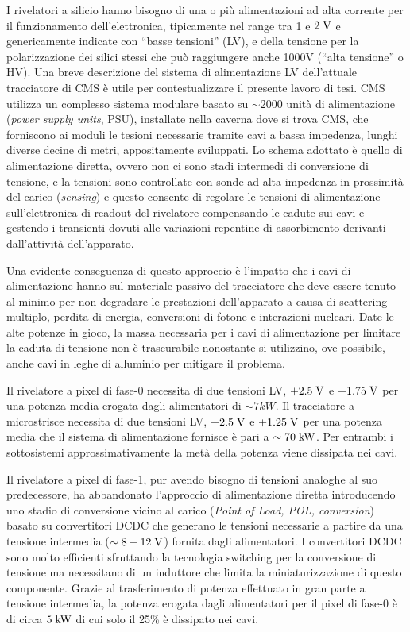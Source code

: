 I rivelatori a silicio hanno bisogno di una o pi\`u alimentazioni ad alta corrente per il funzionamento dell'elettronica, tipicamente nel range tra 1 e $2\rm \; V$ e genericamente indicate con ``basse tensioni'' (LV), e della tensione per la polarizzazione dei silici stessi che pu\`o raggiungere anche 1000V (``alta tensione'' o HV). Una breve descrizione del sistema di alimentazione LV dell'attuale tracciatore di CMS \`e utile per contestualizzare il presente lavoro di tesi. CMS utilizza un complesso sistema modulare basato su $\sim 2000$ unit\`a di alimentazione ({\em power supply units}, PSU), installate nella caverna dove si trova CMS, che forniscono ai moduli le tesioni necessarie tramite cavi a bassa impedenza, lunghi diverse decine di metri,
appositamente sviluppati. Lo schema adottato \`e quello di alimentazione diretta, ovvero non ci sono stadi intermedi di conversione di tensione, e la tensioni sono controllate con sonde ad alta impedenza in prossimit\`a del carico ({\em sensing}) e questo consente di regolare le tensioni di alimentazione sull’elettronica di readout del rivelatore compensando le cadute sui cavi e gestendo i transienti dovuti alle variazioni repentine di assorbimento derivanti dall'attivit\`a dell'apparato.

Una evidente conseguenza di questo approccio \`e l'impatto che i cavi di alimentazione hanno sul materiale passivo del tracciatore che deve essere tenuto al minimo per non degradare le prestazioni dell'apparato a causa di scattering multiplo, perdita di energia, conversioni di fotone e interazioni nucleari.  
Date le alte potenze in gioco, la massa necessaria per i cavi di alimentazione per limitare la caduta di tensione non \`e trascurabile nonostante si utilizzino, ove possibile, anche cavi in leghe di alluminio per mitigare il problema.

Il rivelatore a pixel di fase-0 necessita di due tensioni LV, $+2.5\rm \; V$ e $+1.75\rm \; V$ per una potenza media erogata dagli alimentatori di $\sim 7kW$. Il tracciatore a microstrisce necessita di due tensioni LV, $+2.5\rm \; V$ e $+1.25\rm \; V$ per una potenza media che il sistema di alimentazione fornisce \`e pari a $\sim 70\rm \; kW$. Per entrambi i sottosistemi approssimativamente la met\`a della potenza viene dissipata nei cavi.

Il rivelatore a pixel di fase-1, pur avendo bisogno di tensioni analoghe al suo predecessore, ha abbandonato l'approccio di alimentazione diretta introducendo uno stadio di conversione vicino al carico ({\em Point of Load, POL, conversion}) basato su convertitori DCDC che generano le tensioni necessarie a partire da una tensione intermedia ($\sim 8-12\rm \; V$) fornita dagli alimentatori. I convertitori DCDC sono molto efficienti sfruttando la tecnologia switching per la conversione di tensione ma necessitano di un induttore che limita la miniaturizzazione di questo componente. Grazie al trasferimento di potenza effettuato in gran parte a tensione intermedia, la potenza erogata dagli alimentatori per il pixel di fase-0 \`e di circa $5\rm \; kW$ di cui solo il 25\% \`e dissipato nei cavi.

